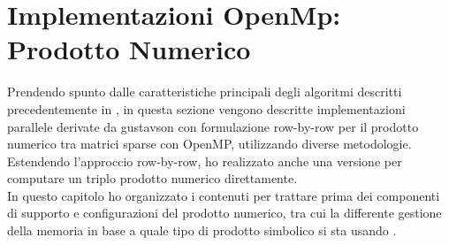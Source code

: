 \chapter[Implementazioni OpenMp: Prodotto Numerico]
{Implementazioni OpenMp:\\Prodotto Numerico}
\label{Chapter3}





Prendendo spunto dalle caratteristiche principali degli algoritmi descritti precedentemente in , 
in questa sezione vengono descritte implementazioni parallele derivate da gustavson \cite{gustavson} 
con formulazione row-by-row  per il prodotto numerico tra matrici sparse con OpenMP, 
utilizzando diverse metodologie.
Estendendo l'approccio row-by-row, ho realizzato anche una versione per computare un triplo prodotto numerico direttamente.\\
In questo capitolo ho organizzato i contenuti per trattare prima dei componenti di supporto e configurazioni del prodotto numerico,
tra cui la differente gestione della memoria in base a quale tipo di prodotto simbolico si sta usando .\\



